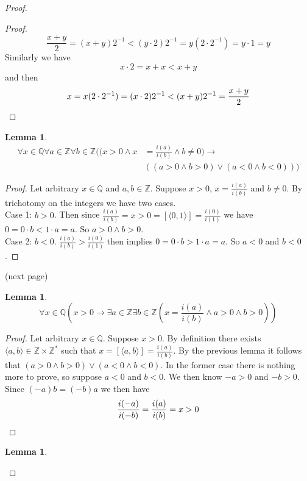 \documentclass{report}
\newtheorem{lemma}[theo]{Lemma}
\begin{document}
\begin{proof}
\begin{proof}
\begin{equation*}
\frac{x+y}{2}=(x+y)2^{-1}<(y\cdot2)2^{-1}=y(2\cdot2^{-1})=y\cdot1=y
\end{equation*}
Similarly we have
\begin{equation*}
x\cdot2=x+x<x+y
\end{equation*}
and then
\begin{equation*}
x=x(2\cdot2^{-1})=(x\cdot2)2^{-1}<(x+y)2^{-1}=\frac{x+y}{2}\qedhere
\end{equation*}
\end{proof}
\begin{lemma}
\begin{align*}
\forall x\in\mathbb Q\forall a\in\mathbb Z\forall b\in\mathbb Z((x>0\land x&=\frac{i(a)}{i(b)}\land b\neq0)\to\\
&((a>0\land b>0)\lor(a<0\land b<0)))
\end{align*}
\end{lemma}
\begin{proof}
Let arbitrary $x\in\mathbb Q$ and $a,b\in\mathbb Z$. Suppose $x>0$, $x=\frac{i(a)}{i(b)}$ and $b\neq0$. 
By trichotomy on the integers we have two cases.\\
\indent Case 1: $b>0$. Then since $\frac{i(a)}{i(b)}=x>0=[\langle 0,1\rangle]=\frac{i(0)}{i(1)}$ we
have $0=0\cdot b<1\cdot a=a$. So $a>0\land b>0$.\\
\indent Case 2: $b<0$. $\frac{i(a)}{i(b)}>\frac{i(0)}{i(1)}$ then implies $0=0\cdot b>1\cdot a=a$. 
So $a<0$ and $b<0$.
\end{proof}
\noindent(next page)\newpage
\begin{lemma}\label{Qmp_1}
\begin{equation*}
\forall x\in\mathbb Q(x>0\to\exists a\in\mathbb Z\exists b\in\mathbb Z(x=\frac{i(a)}{i(b)}\land a>0\land b>0))
\end{equation*}
\end{lemma}
\begin{proof}
Let arbitrary $x\in\mathbb Q$. Suppose $x>0$. By definition there exists $\langle a,b\rangle\in\mathbb Z\times\mathbb Z^*$ such that 
$x=[\langle a,b\rangle]=\frac{i(a)}{i(b)}$. By the previous lemma it follows that $(a>0\land b>0)\lor(a<0\land b<0)$. In the former case there is
nothing more to prove, so suppose $a<0$ and $b<0$.
We then know $-a>0$ and $-b>0$. Since $(-a)b=(-b)a$ we then have
\begin{equation*}
\frac{i(-a)}{i(-b)}=\frac{i(a)}{i(b)}=x>0\qedhere
\end{equation*}
\end{proof}
\begin{lemma}

\end{lemma}
\end{proof}
\end{document}
